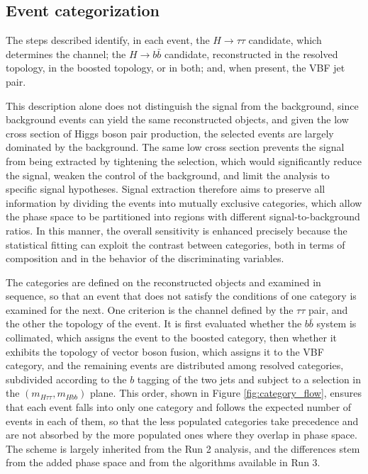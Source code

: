 \subsection{Event categorization}
The steps described identify, in each event, the $H\to\tau\tau$ candidate, which determines the channel; the $H\to b\bar{b}$ candidate, reconstructed in the resolved topology, in the boosted topology, or in both; and, when present, the VBF jet pair. 

This description alone does not distinguish the signal from the background, since background events can yield the same reconstructed objects, and given the low cross section of Higgs boson pair production, the selected events are largely dominated by the background. The same low cross section prevents the signal from being extracted by tightening the selection, which would significantly reduce the signal, weaken the control of the background, and limit the analysis to specific signal hypotheses. Signal extraction therefore aims to preserve all information by dividing the events into mutually exclusive categories, which allow the phase space to be partitioned into regions with different signal-to-background ratios. In this manner, the overall sensitivity is enhanced precisely because the statistical fitting can exploit the contrast between categories, both in terms of composition and in the behavior of the discriminating variables.

The categories are defined on the reconstructed objects and examined in sequence, so that an event that does not satisfy the conditions of one category is examined for the next. One criterion is the channel defined by the $\tau\tau$ pair, and the other the topology of the event. It is first evaluated whether the $b\bar{b}$ system is collimated, which assigns the event to the boosted category, then whether it exhibits the topology of vector boson fusion, which assigns it to the VBF category, and the remaining events are distributed among resolved categories, subdivided according to the $b$ tagging of the two jets and subject to a selection in the $(m_{H\tau\tau}, m_{Hbb})$ plane. This order, shown in Figure \ref{fig:category_flow}, ensures that each event falls into only one category and follows the expected number of events in each of them, so that the less populated categories take precedence and are not absorbed by the more populated ones where they overlap in phase space. The scheme is largely inherited from the Run 2 analysis, and the differences stem from the added phase space and from the algorithms available in Run 3.

